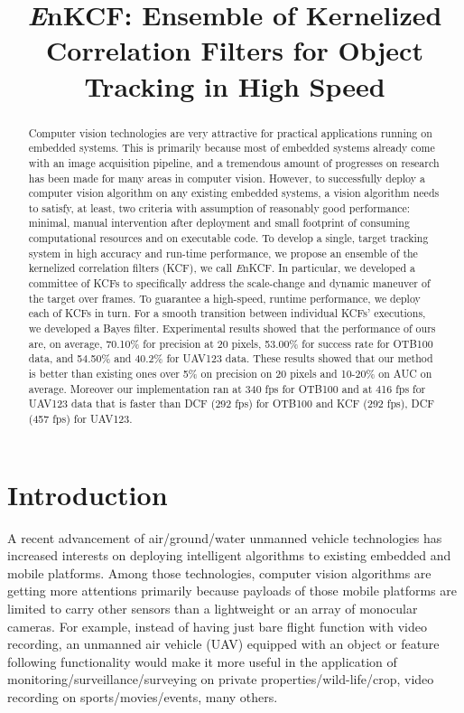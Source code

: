 \documentclass{bmvc2k}
\title{ {\it E}nKCF: Ensemble of Kernelized Correlation Filters for Object Tracking in High Speed}
\begin{document}
\maketitle

\begin{abstract}
Computer vision technologies are very attractive for practical
applications running on embedded systems. This is primarily because
most of embedded systems already come with an image acquisition
pipeline, and a tremendous amount of progresses on research has been
made for many areas in computer vision. However, to successfully
deploy a computer vision algorithm on any existing embedded systems, a
vision algorithm needs to satisfy, at least, two criteria with
assumption of reasonably good performance: minimal, manual
intervention after deployment and small footprint of consuming
computational resources and on executable code. To develop a single,
target tracking system in high accuracy and run-time performance, we
propose an ensemble of the kernelized correlation filters (KCF), we
call {\it E}nKCF. In particular, we developed a committee of KCFs to
specifically address the scale-change and dynamic maneuver of the
target over frames. To guarantee a high-speed, runtime performance, we
deploy each of KCFs in turn. For a smooth transition between
individual KCFs' executions, we developed a Bayes filter. Experimental
results showed that the performance of ours are, on average, 70.10\%
for precision at 20 pixels, 53.00\% for success rate for OTB100 data,
and 54.50\% and 40.2\% for UAV123 data. These results showed that our
method is better than existing ones over 5\% on precision on 20 pixels
and 10-20\% on AUC on average. Moreover our implementation ran at 340
fps for OTB100 and at 416 fps for UAV123 data that is faster than DCF
(292 fps) for OTB100 and KCF (292 fps), DCF (457 fps) for UAV123.
\end{abstract}

\section{Introduction}
A recent advancement of air/ground/water unmanned vehicle technologies
has increased interests on deploying intelligent algorithms to
existing embedded and mobile platforms. Among those technologies,
computer vision algorithms are getting more attentions primarily
because payloads of those mobile platforms are limited to carry other
sensors than a lightweight or an array of monocular cameras. For
example, instead of having just bare flight function with video
recording, an unmanned air vehicle (UAV) equipped with an object or
feature following functionality would make it more useful in the
application of monitoring/surveillance/surveying on private
properties/wild-life/crop, video recording on sports/movies/events,
many others.
\end{document}
